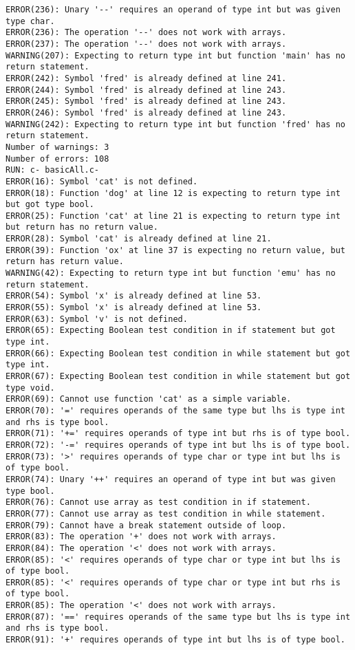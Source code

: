 \documentclass[12pt]{book}
\begin{document}
\begin{lstlisting}
ERROR(236): Unary '--' requires an operand of type int but was given type char.
ERROR(236): The operation '--' does not work with arrays.
ERROR(237): The operation '--' does not work with arrays.
WARNING(207): Expecting to return type int but function 'main' has no return statement.
ERROR(242): Symbol 'fred' is already defined at line 241.
ERROR(244): Symbol 'fred' is already defined at line 243.
ERROR(245): Symbol 'fred' is already defined at line 243.
ERROR(246): Symbol 'fred' is already defined at line 243.
WARNING(242): Expecting to return type int but function 'fred' has no return statement.
Number of warnings: 3
Number of errors: 108
RUN: c- basicAll.c-
ERROR(16): Symbol 'cat' is not defined.
ERROR(18): Function 'dog' at line 12 is expecting to return type int but got type bool.
ERROR(25): Function 'cat' at line 21 is expecting to return type int but return has no return value.
ERROR(28): Symbol 'cat' is already defined at line 21.
ERROR(39): Function 'ox' at line 37 is expecting no return value, but return has return value.
WARNING(42): Expecting to return type int but function 'emu' has no return statement.
ERROR(54): Symbol 'x' is already defined at line 53.
ERROR(55): Symbol 'x' is already defined at line 53.
ERROR(63): Symbol 'v' is not defined.
ERROR(65): Expecting Boolean test condition in if statement but got type int.
ERROR(66): Expecting Boolean test condition in while statement but got type int.
ERROR(67): Expecting Boolean test condition in while statement but got type void.
ERROR(69): Cannot use function 'cat' as a simple variable.
ERROR(70): '=' requires operands of the same type but lhs is type int and rhs is type bool.
ERROR(71): '+=' requires operands of type int but rhs is of type bool.
ERROR(72): '-=' requires operands of type int but lhs is of type bool.
ERROR(73): '>' requires operands of type char or type int but lhs is of type bool.
ERROR(74): Unary '++' requires an operand of type int but was given type bool.
ERROR(76): Cannot use array as test condition in if statement.
ERROR(77): Cannot use array as test condition in while statement.
ERROR(79): Cannot have a break statement outside of loop.
ERROR(83): The operation '+' does not work with arrays.
ERROR(84): The operation '<' does not work with arrays.
ERROR(85): '<' requires operands of type char or type int but lhs is of type bool.
ERROR(85): '<' requires operands of type char or type int but rhs is of type bool.
ERROR(85): The operation '<' does not work with arrays.
ERROR(87): '==' requires operands of the same type but lhs is type int and rhs is type bool.
ERROR(91): '+' requires operands of type int but lhs is of type bool.

\end{lstlisting}
\end{document}
